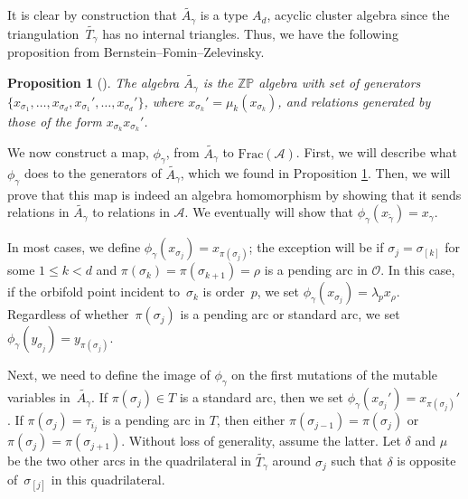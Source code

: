 \documentclass[11pt]{article}
\numberwithin{equation}{section}
\newtheorem{Proposition}[Theorem]{Proposition}
\begin{document}
It is clear by construction that $\widetilde{A_\gamma}$ is a type $A_d$, acyclic cluster algebra since the triangulation~$\widetilde{T_\gamma}$ has no internal triangles. Thus, we have the following proposition from Bernstein--Fomin--Zelevinsky.

\begin{Proposition}[{\cite[Corollary~1.21]{BFZ}}] \label{prop:Agamma}The algebra $\widetilde{A_\gamma}$ is the $\mathbb{ZP}$ algebra with set of generators $\{x_{\sigma_1}, \ldots, x_{\sigma_d}, x_{\sigma_1}', \ldots, x_{\sigma_d}'\}$, where $x_{\sigma_k}' = \mu_k(x_{\sigma_k})$, and relations generated by those of the form $x_{\sigma_k}x_{\sigma_k}'$.
\end{Proposition}

We now construct a map, $\phi_\gamma$, from $\widetilde{A_\gamma}$ to $\text{Frac}(\mathcal{A})$. First, we will describe what $\phi_\gamma$ does to the generators of $\widetilde{A_\gamma}$, which we found in Proposition \ref{prop:Agamma}. Then, we will prove that this map is indeed an algebra homomorphism by showing that it sends relations in $\widetilde{A_\gamma}$ to relations in $\mathcal{A}$. We eventually will show that $\phi_\gamma(x_{\widetilde{\gamma}}) = x_\gamma$.

In most cases, we define $\phi_\gamma(x_{\sigma_j}) = x_{\pi(\sigma_j)}$; the exception will be if $\sigma_j = \sigma_{[k]}$ for some $1 \leq k < d$ and $\pi(\sigma_k) = \pi(\sigma_{k+1}) = \rho$ is a pending arc in $\mathcal{O}$. In this case, if the orbifold point incident to~$\sigma_k$ is order~$p$, we set $\phi_\gamma(x_{\sigma_j}) = \lambda_p x_\rho$.
Regardless of whether~$\pi(\sigma_j)$ is a pending arc or standard arc, we set $\phi_\gamma(y_{\sigma_j}) = y_{\pi(\sigma_j)}$.

Next, we need to define the image of $\phi_\gamma$ on the first mutations of the mutable variables in~$\widetilde{A_\gamma}$. If $\pi(\sigma_j) \in T$ is a standard arc, then we set $\phi_\gamma(x_{\sigma_j}') = x_{\pi(\sigma_j)}'$. If $\pi(\sigma_j) = \tau_{i_j}$ is a pending arc in $T$, then either $\pi(\sigma_{j-1}) = \pi(\sigma_j)$ or $\pi(\sigma_{j}) = \pi(\sigma_{j+1})$. Without loss of generality, assume the latter. Let $\delta$ and $\mu$ be the two other arcs in the quadrilateral in $\widetilde{T_\gamma}$ around $\sigma_j$ such that $\delta$ is opposite of~$\sigma_{[j]}$ in this quadrilateral.
\end{document}
